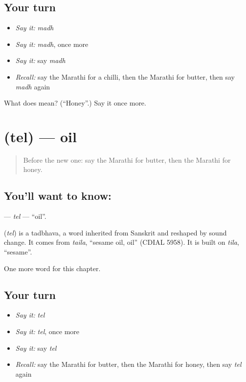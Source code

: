 \subsection*{Your turn}
\begin{itemize}
\raggedright
  \item \emph{Say it:} \emph{madh}
  \item \emph{Say it:} \emph{madh}, once more
  \item \emph{Say it:} say \emph{madh}
  \item \emph{Recall:} say the Marathi for a chilli, then the Marathi for butter, then say \emph{madh} again
\end{itemize}

\begin{tcolorbox}[breakable,colback=teal!4,colframe=teal!35!black,title={Before you move on}]
What does  mean? (\textquotedblleft{}Honey\textquotedblright{}.) Say it once more.
\end{tcolorbox}
\section[\texorpdfstring{\mr{तेल} (tel)}{तेल (tel)}]{ (tel) — oil}

\label{lesson:MR-C87-tel}



\begin{quote}
Before the new one: say the Marathi for butter, then the Marathi for honey.
\end{quote}

\subsection*{You'll want to know: }
\textbf{} — \emph{tel} — \textquotedblleft{}oil\textquotedblright{}.

\begin{cousinweb}
\textbf{} (\emph{tel}) is a tadbhava, a word inherited from Sanskrit and reshaped by sound change. It comes from \emph{taila}, \textquotedblleft{}sesame oil, oil\textquotedblright{} (CDIAL 5958). It is built on \emph{tila}, \textquotedblleft{}sesame\textquotedblright{}.
\end{cousinweb}

\begin{grammarlens}[title={What you've built}]
One more word for this chapter.
\end{grammarlens}

\subsection*{Your turn}
\begin{itemize}
\raggedright
  \item \emph{Say it:} \emph{tel}
  \item \emph{Say it:} \emph{tel}, once more
  \item \emph{Say it:} say \emph{tel}
  \item \emph{Recall:} say the Marathi for butter, then the Marathi for honey, then say \emph{tel} again
\end{itemize}

